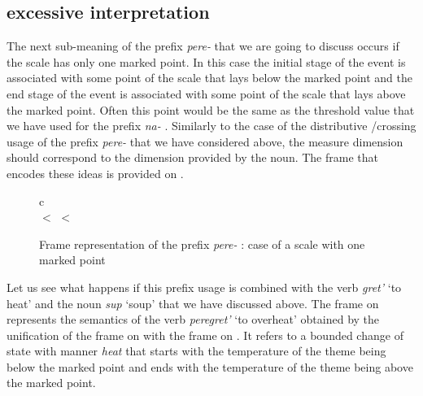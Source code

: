 \subsection{excessive  interpretation}
The next sub-meaning of the prefix \textit{pere-}   that we are going to discuss occurs if the scale has only one marked point. In this case the initial stage of the event is associated with some point of the scale that lays below the marked point and the end stage of the event is associated with some point of the scale that lays above the marked point. Often this point would be the same as the threshold value that we have used for the prefix \textit{na-}  . Similarly to the case of the distributive /crossing usage of the prefix \textit{pere-}   that we have considered above, the measure dimension should correspond to the dimension provided by the noun. The frame that encodes these ideas is provided on .
\begin{figure}
\begin{center}
\begin{tabular}{c}
\\
 $<$  $<$ 
\end{tabular}
\end{center}
\caption{Frame representation of the prefix \textit{pere-}  : case of a scale with one marked point \label{frame:pere:over}}
\end{figure}

Let us see what happens if this prefix usage is combined with the verb \textit{gret'} `to heat' and the noun \textit{sup} `soup' that we have discussed above. The frame on  represents the semantics of the verb \textit{peregret'} `to overheat' obtained by the unification of the frame on  with the frame on . It refers to a bounded change of state with manner \textit{heat} that starts with the temperature of the theme being below the marked point and ends with the temperature of the theme being above the marked point.

